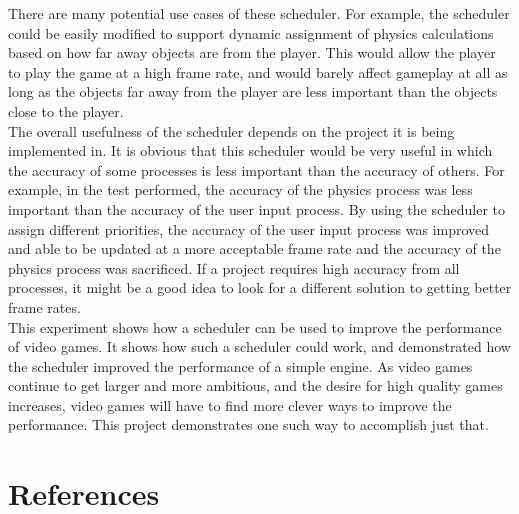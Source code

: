 \documentclass[a4paper, 12pt]{article}
\begin{document}
    There are many potential use cases of these scheduler. For example, the scheduler could be easily modified to support dynamic assignment of physics calculations based on how far away objects are from the player. This would allow the player to play the game at a high frame rate, and would barely affect gameplay at all as long as the objects far away from the player are less important than the objects close to the player. 
    \\

    The overall usefulness of the scheduler depends on the project it is being implemented in. It is obvious that this scheduler would be very useful in which the accuracy of some processes is less important than the accuracy of others. For example, in the test performed, the accuracy of the physics process was less important than the accuracy of the user input process. By using the scheduler to assign different priorities, the accuracy of the user input process was improved and able to be updated at a more acceptable frame rate and the accuracy of the physics process was sacrificed. If a project requires high accuracy from all processes, it might be a good idea to look for a different solution to getting better frame rates. 
    \\

    This experiment shows how a scheduler can be used to improve the performance of video games. It shows how such a scheduler could work, and demonstrated how the scheduler improved the performance of a simple engine. As video games continue to get larger and more ambitious, and the desire for high quality games increases, video games will have to find more clever ways to improve the performance. This project demonstrates one such way to accomplish just that.

\newpage

\section{References}
\end{document}
